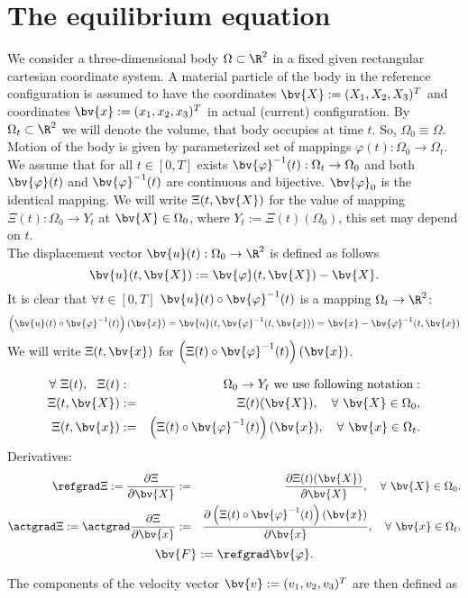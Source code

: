 \section{The equilibrium equation}\label{sec:LargeViscoplacticity:EquilibriumEquation}
We consider a three-dimensional body $\Omega\subset\R^2$ in a fixed given rectangular cartesian coordinate system. A material particle of the body in the reference configuration is assumed to have the coordinates $\bv{X}:=(X_1,X_2,X_3)^T$ and coordinates $\bv{x}:=(x_1,x_2,x_3)^T$ in actual (current) configuration. By $\Omega_t\subset\R^2$ we will denote the volume, that body occupies at time $t$. So, $\Omega_0\equiv\Omega$. Motion of the body is given by parameterized set of mappings $\varphi(t): \Omega_0\rightarrow \Omega_t$. We assume that for all $t\in[0,T]$ exists $\bv{\varphi}^{-1}(t):\Omega_t\rightarrow \Omega_0$ and both $\bv{\varphi}(t)$ and $\bv{\varphi}^{-1}(t)$ are continuous and bijective. $\bv{\varphi}_0$ is the identical mapping. We will write $\Xi(t,\bv{X})$ for the value of mapping $\Xi(t):\Omega_0\rightarrow Y_t$ at $\bv{X}\in\Omega_0$, where $Y_t:=\Xi(t)(\Omega_0)$, this set may depend on $t$.\\
The displacement vector $\bv{u}(t):\Omega_0\rightarrow \R^2$ is defined as follows		
\begin{equation}
\bv{u}(t,\bv{X}):=\bv{\varphi}(t,\bv{X})-\bv{X}.
\end{equation}
It is clear that $\forall t\in[0,T]$ $\bv{u}(t)\circ\bv{\varphi}^{-1}(t)$ is a mapping $\Omega_t\rightarrow \R^2$:
\begin{equation}
\left(\bv{u}(t)\circ\bv{\varphi}^{-1}(t)\right)(\bv{x})=\bv{u}(t,\bv{\varphi}^{-1}(t,\bv{x}))=\bv{x}-\bv{\varphi}^{-1}(t,\bv{x})
\end{equation}
We will write $\Xi(t,\bv{x})$ for  $\left(\Xi(t)\circ\bv{\varphi}^{-1}(t)\right)(\bv{x})$.
\begin{definition}
\begin{eqnarray}
\forall~ \Xi(t),~~ \Xi(t) &:&\Omega_0\rightarrow Y_t \mbox{ we use following notation}: \nonumber \\
\Xi(t,\bv{X})&:=&\Xi(t)(\bv{X}),\quad \forall~ \bv{X}\in \Omega_0, \nonumber \\
\Xi(t,\bv{x})&:=&\left(\Xi(t)\circ\bv{\varphi}^{-1}(t)\right)(\bv{x}),\quad \forall~ \bv{x}\in \Omega_t. \nonumber 
\end{eqnarray}
Derivatives:
\begin{eqnarray}
\refgrad \Xi:= \frac{\partial \Xi}{\partial \bv{X}}&:=&\frac{\partial \Xi(t)(\bv{X})}{\partial \bv{X}},\quad \forall~ \bv{X}\in \Omega_0. \nonumber \\
\actgrad \Xi:= \actgrad \frac{\partial \Xi}{\partial \bv{x}}&:=&\frac{\partial \left(\Xi(t)\circ\bv{\varphi}^{-1}(t)\right)(\bv{x})}{\partial \bv{x}},\quad \forall~ \bv{x}\in \Omega_t. \nonumber 
\end{eqnarray}
\begin{equation}
\bv{F}:=\refgrad \bv{\varphi}.
\end{equation}
\end{definition}
The components of the velocity vector $\bv{v}:=(v_1,v_2,v_3)^T$ are then defined as

